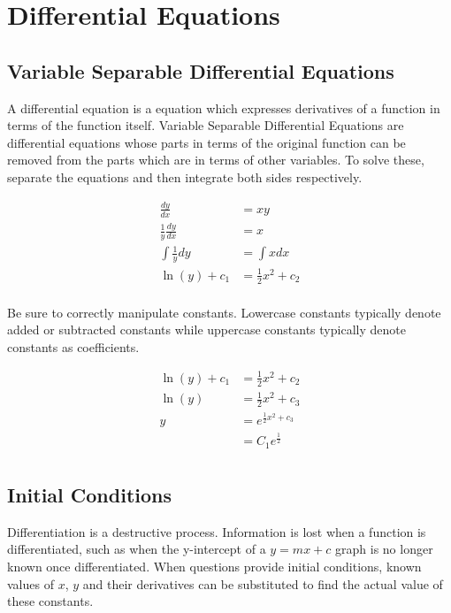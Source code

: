 \documentclass[../main]{subfiles}
\begin{document}
\section{Differential Equations}

	\subsection{Variable Separable Differential Equations}

	A differential equation is a equation which expresses derivatives of a function in terms of the function itself. Variable Separable Differential Equations are differential equations whose parts in terms of the original function can be removed from the parts which are in terms of other variables. To solve these, separate the equations and then integrate both sides respectively.

	\begin{equation*} \begin{aligned}
		\frac{dy}{dx} & = xy \\
		\frac{1}{y} \frac{dy}{dx} & = x \\
		\int \frac{1}{y} dy & = \int x dx \\
		\ln(y) + c_1 & = \frac{1}{2} x^2 + c_2 \\
	\end{aligned} \end{equation*}

	Be sure to correctly manipulate constants. Lowercase constants typically denote added or subtracted constants while uppercase constants typically denote constants as coefficients.

	\begin{equation*} \begin{aligned}
		\ln(y) + c_1 & = \frac{1}{2} x^2 + c_2 \\
		\ln(y) & = \frac{1}{2} x^2 + c_3 \\
		y & = e^{\frac{1}{2} x^2 + c_3} \\
		& = C_1e^{\frac{1}{2}} \\
	\end{aligned} \end{equation*}

	\subsection{Initial Conditions}

	Differentiation is a destructive process. Information is lost when a function is differentiated, such as when the y-intercept of a \(y=mx+c\) graph is no longer known once differentiated. When questions provide initial conditions, known values of \(x\), \(y\) and their derivatives can be substituted to find the actual value of these constants. \\
\end{document}
